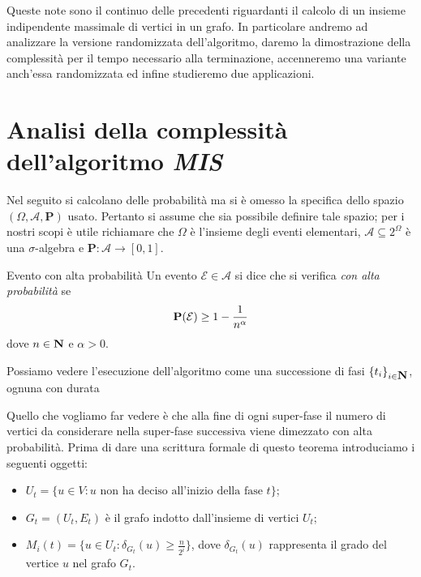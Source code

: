 \documentclass{article}
\begin{document}
\maketitle

Queste note sono il continuo delle precedenti riguardanti il calcolo di
un insieme indipendente massimale di vertici in un grafo. In particolare
andremo ad analizzare la versione randomizzata dell'algoritmo, daremo la 
dimostrazione della complessit\`a per il tempo necessario alla terminazione, 
accenneremo una variante anch'essa randomizzata ed infine studieremo due applicazioni.

\section{Analisi della complessit\`a dell'algoritmo \emph{MIS}}
Nel seguito si calcolano delle probabilit\`a ma si \`e omesso la
specifica dello spazio $(\Omega, \mathcal{A}, \mathbf{P})$ 
usato. Pertanto si assume che sia possibile definire tale spazio; per i
nostri scopi \`e utile richiamare che $\Omega$ \`e l'insieme degli 
eventi elementari, $\mathcal{A}\subseteq 2^{\Omega}$ 
\`e una $\sigma$-algebra e $\mathbf{P}: \mathcal{A} \rightarrow [0,1]$.

\begin{defn}{Evento con alta probabilit\`a}
Un evento $\mathcal{E} \in \mathcal{A}$ si dice che si verifica \emph{
con alta probabilit\`a} se 
\begin{displaymath}
    \mathbf{P}(\mathcal{E}) \geq 1 - {{1} \over {n^\alpha}} 
\end{displaymath}
dove $n \in \mbox{{\bfseries N}}$ e $\alpha > 0$.
\end{defn}

Possiamo vedere l'esecuzione dell'algoritmo come una successione di fasi
$\lbrace t_i \rbrace_{i \in \mbox{{\bfseries N}}}$, ognuna con durata 

Quello che vogliamo far vedere \`e che alla fine di ogni super-fase il 
numero di vertici da considerare nella super-fase successiva viene 
dimezzato con alta probabilit\`a. Prima di dare una scrittura formale di questo 
teorema introduciamo i seguenti oggetti:
\begin{itemize}
    \item $U_t = \lbrace u \in V : u \text{ non ha deciso all'inizio della
        fase } t \rbrace$;
    \item $G_t = (U_t, E_t)$ \`e il grafo indotto dall'insieme di vertici $U_t$;
    \item $M_i(t) = \lbrace u \in U_t : \delta_{G_t}(u) \geq 
        \frac{n}{2^i} \rbrace$, dove $\delta_{G_t}(u)$ rappresenta il grado
        del vertice $u$ nel grafo $G_t$.
\end{itemize}
\end{document}
